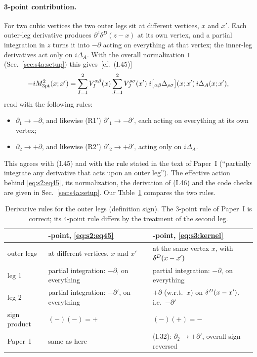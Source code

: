 \documentclass[aps,prd,onecolumn,10pt,nofootinbib,floatfix]{revtex4-2}
\newcommand{\PI}{Paper~I}
\newcommand{\eqI}[1]{(I.#1)}
\begin{document}
\paragraph*{3-point contribution.}
For two cubic vertices the two outer legs sit at different vertices, $x$
and $x'$. Each outer-leg derivative produces $\partial^z\delta^D(z-x)$ at
its own vertex, and a partial integration in $z$ turns it into $-\partial$
acting on everything at that vertex; the inner-leg derivatives act only on
$i\Delta_A$. With the overall normalization $1$ (Sec.~\ref{sec:s4a:setup})
this gives~[cf.\ \eqI{45}]
\begin{equation}
-iM^2_{\rm 3pt}(x;x')=\sum_{I=1}^2V_I^{\alpha\beta}(x)\sum_{J=1}^2V_J^{\rho\sigma}(x')\;
i\big[{}_{\alpha\beta}\Delta_{\rho\sigma}\big](x;x')\,i\Delta_A(x;x'),
\label{eq:s2:eq45}
\end{equation}
read with the following rules:
\begin{itemize}
\item[(R1)] $\partial_1\to-\partial$, and likewise (R1$'$)
$\partial'_1\to-\partial'$, each acting on everything at its own vertex;
\item[(R2)] $\partial_2\to+\partial$, and likewise (R2$'$)
$\partial'_2\to+\partial'$, acting only on $i\Delta_A$.
\end{itemize}
This agrees with \eqI{45} and with the rule stated in the text of \PI{}
(``partially integrate any derivative that acts upon an outer leg''). The
effective action behind \eqref{eq:s2:eq45}, its normalization, the
derivation of \eqI{46} and the code checks are given in
Sec.~\ref{sec:s4a:setup}. Our Table~\ref{tab:s2:rules} compares the two rules.

\begin{table}[tb]
\caption{Derivative rules for the outer legs (definition sign). The 3-point
rule of \PI{} is correct; its 4-point rule differs by the treatment of the
second leg.}
\label{tab:s2:rules}
\begin{ruledtabular}
\begin{tabular}{>{\raggedright\arraybackslash}p{}>{\raggedright\arraybackslash}p{}>{\raggedright\arraybackslash}p{}}
 & 3-point, \eqref{eq:s2:eq45} & 4-point, \eqref{eq:s3:kernel}\\
\hline
outer legs & at different vertices, $x$ and $x'$ & at the same vertex $x$, with $\delta^D(x-x')$\\
leg 1 & partial integration: $-\partial$, on everything & partial integration: $-\partial$, on everything\\
leg 2 & partial integration: $-\partial'$, on everything & $+\partial$ (w.r.t.\ $x$) on $\delta^D(x-x')$, i.e.\ $-\partial'$\\
sign product & $(-)(-)=+$ & $(-)(+)=-$\\
\PI & same as here & \eqI{32}: $\partial_2\to+\partial'$, overall sign reversed\\
\end{tabular}
\end{ruledtabular}
\end{table}
\end{document}
